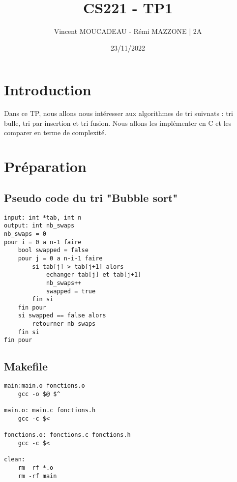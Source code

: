 \documentclass[12pt]{article}
\title{CS221 - TP1}
\author{Vincent MOUCADEAU - Rémi MAZZONE | 2A}
\date{23/11/2022}
\begin{document}
\maketitle

\tableofcontents
\lstlistoflistings

\newpage

\section{Introduction}
Dans ce TP, nous allons nous intéresser aux algorithmes de tri suivnats : tri bulle, tri par insertion et tri fusion. Nous allons les implémenter en C et les comparer en terme de complexité. 

\section{Préparation} 
\subsection{Pseudo code du tri "Bubble sort"} 

\begin{lstlisting}[style=pseudoCode, caption=Pseudo code du tri "Bubble sort" optimisé]
input: int *tab, int n
output: int nb_swaps
nb_swaps = 0
pour i = 0 a n-1 faire
    bool swapped = false
    pour j = 0 a n-i-1 faire
        si tab[j] > tab[j+1] alors
            echanger tab[j] et tab[j+1]
            nb_swaps++
            swapped = true
        fin si
    fin pour
    si swapped == false alors
        retourner nb_swaps
    fin si
fin pour
\end{lstlisting} 

\subsection{Makefile} 
\begin{lstlisting}[style=Makefile, caption=Makefile du projet]
main:main.o fonctions.o 
    gcc -o $@ $^

main.o: main.c fonctions.h 
    gcc -c $<

fonctions.o: fonctions.c fonctions.h 
    gcc -c $<

clean: 
    rm -rf *.o 
    rm -rf main
\end{lstlisting} 
\end{document}
